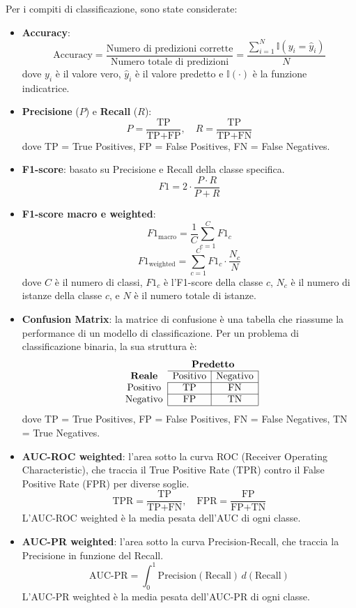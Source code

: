 \documentclass[a4paper,12pt]{report}
\begin{document}
	Per i compiti di classificazione, sono state considerate:
	\begin{itemize}
		\item \textbf{Accuracy}:
		\[
		\text{Accuracy} = \frac{\text{Numero di predizioni corrette}}{\text{Numero totale di predizioni}} = \frac{\sum_{i=1}^{N} \mathbb{I}(y_i = \hat{y}_i)}{N}
		\]
		dove $y_i$ è il valore vero, $\hat{y}_i$ è il valore predetto e $\mathbb{I}(\cdot)$ è la funzione indicatrice.
		
		\item \textbf{Precisione} ($P$) e \textbf{Recall} ($R$):
		\[
		P = \frac{\text{TP}}{\text{TP} + \text{FP}}, \quad R = \frac{\text{TP}}{\text{TP} + \text{FN}}
		\]
		dove TP = True Positives, FP = False Positives, FN = False Negatives.
		
		\item \textbf{F1-score}: basato su Precisione e Recall della classe specifica.
		\[
		F1 = 2 \cdot \frac{P \cdot R}{P + R}
		\]
		
		\item \textbf{F1-score macro e weighted}:
		\[
		F1_{\text{macro}} = \frac{1}{C} \sum_{c=1}^{C} F1_c
		\]
		\[
		F1_{\text{weighted}} = \sum_{c=1}^{C} F1_c \cdot \frac{N_c}{N}
		\]
		dove $C$ è il numero di classi, $F1_c$ è l'F1-score della classe $c$, $N_c$ è il numero di istanze della classe $c$, e $N$ è il numero totale di istanze.
		
		\item \textbf{Confusion Matrix}: la matrice di confusione è una tabella che riassume la performance di un modello di classificazione. Per un problema di classificazione binaria, la sua struttura è:
		\[
		\begin{array}{c|c|c|}
			\multicolumn{1}{c}{} & \multicolumn{2}{c}{\textbf{Predetto}} \\
			\cline{2-3}
			\multicolumn{1}{c}{\textbf{Reale}} & \text{Positivo} & \text{Negativo} \\
			\cline{2-3}
			\text{Positivo} & \text{TP} & \text{FN} \\
			\cline{2-3}
			\text{Negativo} & \text{FP} & \text{TN} \\
			\cline{2-3}
		\end{array}
		\]
		dove TP = True Positives, FP = False Positives, FN = False Negatives, TN = True Negatives.
		
		\item \textbf{AUC-ROC weighted}: l'area sotto la curva ROC (Receiver Operating Characteristic), che traccia il True Positive Rate (TPR) contro il False Positive Rate (FPR) per diverse soglie.
		\[
		\text{TPR} = \frac{\text{TP}}{\text{TP} + \text{FN}}, \quad \text{FPR} = \frac{\text{FP}}{\text{FP} + \text{TN}}
		\]
		L'AUC-ROC weighted è la media pesata dell'AUC di ogni classe.
		
		\item \textbf{AUC-PR weighted}: l'area sotto la curva Precision-Recall, che traccia la Precisione in funzione del Recall.
		\[
		\text{AUC-PR} = \int_{0}^{1} \text{Precision}(\text{Recall}) \, d(\text{Recall})
		\]
		L'AUC-PR weighted è la media pesata dell'AUC-PR di ogni classe.
	\end{itemize}
	
\end{document}
